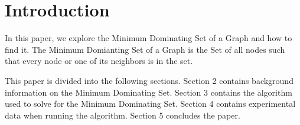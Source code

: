 \documentclass[paper.tex]{subfiles}
\begin{document}
\section{Introduction}

In this paper, we explore the Minimum Dominating Set of a Graph and how to find it.
The Minimum Domianting Set of a Graph is the Set of all nodes such that every node or one of its neighbors is in the set.

This paper is divided into the following sections. 
Section 2 contains background information on the Minimum Dominating Set.
Section 3 contains the algorithm used to solve for the Minimum Dominating Set.
Section 4 contains experimental data when running the algorithm.
Section 5 concludes the paper.

\end{document}
